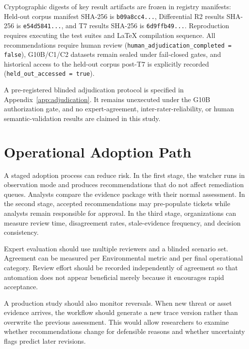 \documentclass[conference]{IEEEtran}
\begin{document}
Cryptographic digests of key result artifacts are frozen in registry manifests:
Held-out corpus manifest SHA-256 is \texttt{b09a8cc4...}, Differential R2 results SHA-256 is \texttt{e54d5841...}, and T7 results SHA-256 is \texttt{6d9ffb49...}.
Reproduction requires executing the test suites and LaTeX compilation sequence. All recommendations require human review (\texttt{human\_adjudication\_completed = false}), G10B/C1/C2 datasets remain sealed under fail-closed gates, and historical access to the held-out corpus post-T7 is explicitly recorded (\texttt{held\_out\_accessed = true}).

A pre-registered blinded adjudication protocol is specified in Appendix~\ref{app:adjudication}. It remains unexecuted under the G10B authorization gate, and no expert-agreement, inter-rater-reliability, or human semantic-validation results are claimed in this study.

\section{Operational Adoption Path}

A staged adoption process can reduce risk. In the first stage, the watcher runs
in observation mode and produces recommendations that do not affect
remediation queues. Analysts compare the evidence package with their normal
assessment. In the second stage, accepted recommendations may pre-populate
tickets while analysts remain responsible for approval. In the third stage,
organizations can measure review time, disagreement rates, stale-evidence
frequency, and decision consistency.

Expert evaluation should use multiple reviewers and a blinded scenario set.
Agreement can be measured per Environmental metric and per final operational
category. Review effort should be recorded independently of agreement so that
automation does not appear beneficial merely because it encourages rapid
acceptance.

A production study should also monitor reversals. When new threat or asset
evidence arrives, the workflow should generate a new trace version rather than
overwrite the previous assessment. This would allow researchers to examine
whether recommendations change for defensible reasons and whether uncertainty
flags predict later revisions.
\end{document}
